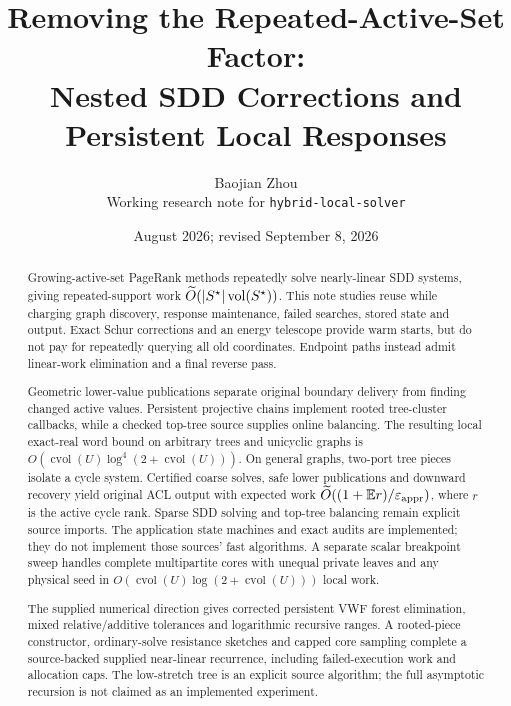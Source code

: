 \documentclass[11pt]{article}
\title{Removing the Repeated-Active-Set Factor:\\
Nested SDD Corrections and Persistent Local Responses}
\author{Baojian Zhou\\
\small Working research note for \texttt{hybrid-local-solver}}
\date{August 2026; revised September 8, 2026}
\begin{document}
\maketitle

\begin{abstract}
Growing-active-set PageRank methods repeatedly solve nearly-linear SDD
systems, giving repeated-support work
$\widetilde O(|S^\star|\operatorname{vol}(S^\star))$. This note studies reuse while
charging graph discovery, response maintenance, failed searches, stored
state and output. Exact Schur corrections and an energy telescope provide
warm starts, but do not pay for repeatedly querying all old coordinates.
Endpoint paths instead admit linear-work elimination and a final reverse pass.

Geometric lower-value publications separate original boundary delivery
from finding changed active values. Persistent projective chains implement
rooted tree-cluster callbacks, while a checked top-tree source supplies
online balancing. The resulting local exact-real word bound on arbitrary
trees and unicyclic graphs is
$O(\operatorname{cvol}(U)\log^4(2+\operatorname{cvol}(U)))$.
On general graphs, two-port tree pieces isolate a cycle system. Certified
coarse solves, safe lower publications and downward recovery yield original
ACL output with expected work
$\widetilde O((1+\mathbb E r)/\varepsilon_{\mathrm{appr}})$, where $r$ is the active
cycle rank. Sparse SDD solving and top-tree balancing remain explicit
source imports. The application state machines and exact audits are
implemented; they do not implement those sources' fast algorithms.
A separate scalar breakpoint sweep handles complete multipartite cores
with unequal private leaves and any physical seed in
$O(\operatorname{cvol}(U)\log(2+\operatorname{cvol}(U)))$ local work.

The supplied numerical direction gives corrected persistent VWF forest
elimination, mixed relative/additive tolerances and logarithmic recursive
ranges. A rooted-piece constructor, ordinary-solve resistance sketches
and capped core sampling complete a source-backed supplied near-linear
recurrence, including failed-execution work and allocation caps.
The low-stretch tree is an explicit source algorithm; the full asymptotic
recursion is not claimed as an implemented experiment.


\end{abstract}
\end{document}

